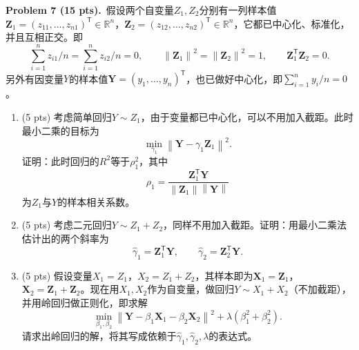 \documentclass[UTF8,a4paper,11pt,fontset=fandol]{ctexart}
\newcommand{\problem}[2]{\par\addvspace{10pt}\Needspace{5\baselineskip}\textbf{Problem #1 (#2 pts).}\ }
\newcommand{\trans}{^{\mathsf T}}
\newcommand{\norm}[1]{\left\lVert #1\right\rVert}
\begin{document}
\newpage
\problem{7}{15}假设两个自变量$Z_1,Z_2$分别有一列样本值$\bm Z_1=(z_{11},\ldots,z_{n1})\trans\in\mathbb R^n$，$\bm Z_2=(z_{12},\ldots,z_{n2})\trans\in\mathbb R^n$，它都已中心化、标准化，并且互相正交。即
\begin{equation*}
  \sum_{i=1}^n z_{i1}/n=\sum_{i=1}^n z_{i2}/n=0,\qquad
  \norm{\bm Z_1}^2=\norm{\bm Z_2}^2=1,\qquad
  \bm Z_1\trans\bm Z_2=0.
\end{equation*}
另外有因变量$Y$的样本值$\bm Y=(y_1,\ldots,y_n)\trans$，也已做好中心化，即$\sum_{i=1}^n y_i/n=0$。
\begin{enumerate}[label=\arabic*.]
  \item (5 pts) 考虑简单回归$Y\sim Z_1$，由于变量都已中心化，可以不用加入截距。此时最小二乘的目标为
  \begin{equation*}
    \min_{\gamma_1}\norm{\bm Y-\gamma_1\bm Z_1}^2.
  \end{equation*}
  证明：此时回归的$R^2$等于$\rho_1^2$，其中
  \begin{equation*}
    \rho_1=\frac{\bm Z_1\trans\bm Y}{\norm{\bm Z_1}\norm{\bm Y}}
  \end{equation*}
  为$Z_1$与$Y$的样本相关系数。

  \item (5 pts) 考虑二元回归$Y\sim Z_1+Z_2$，同样不用加入截距。证明：用最小二乘法估计出的两个斜率为
  \begin{equation*}
    \widehat\gamma_1=\bm Z_1\trans\bm Y,\qquad
    \widehat\gamma_2=\bm Z_2\trans\bm Y.
  \end{equation*}

  \item (5 pts) 假设变量$X_1=Z_1$，$X_2=Z_1+Z_2$，其样本即为$\bm X_1=\bm Z_1$，$\bm X_2=\bm Z_1+\bm Z_2$。现在用$X_1,X_2$作为自变量，做回归$Y\sim X_1+X_2$（不加截距），并用岭回归做正则化，即求解
  \begin{equation*}
    \min_{\beta_1,\beta_2}
    \norm{\bm Y-\beta_1\bm X_1-\beta_2\bm X_2}^2+\lambda(\beta_1^2+\beta_2^2).
  \end{equation*}
  请求出岭回归的解，将其写成依赖于$\widehat\gamma_1,\widehat\gamma_2,\lambda$的表达式。
\end{enumerate}
\end{document}
